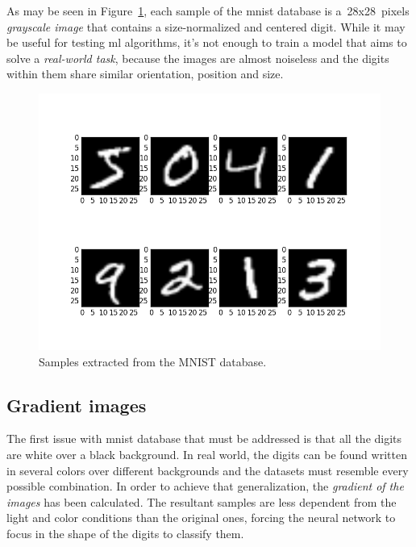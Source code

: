 As may be seen in Figure~\ref{fig:mnist}, each sample of the \gls{mnist} database is a~28x28~pixels \emph{grayscale image} that contains a size-normalized and centered digit. While it may be useful for testing \gls{ml} algorithms, it's not enough to train a model that aims to solve a \emph{real-world task}, because the images are almost noiseless and the digits within them share similar orientation, position and size.
\begin{figure}
	\centering
	\includegraphics[width=12cm, keepaspectratio]{figures/mnist.png}
	\caption{Samples extracted from the MNIST database.}
	\label{fig:mnist}
\end{figure}

\subsection{Gradient images}\label{subsec:edge}
The first issue with \gls{mnist} database that must be addressed is that all the digits are white over a black background. In real world, the digits can be found written in several colors over different backgrounds and the datasets must resemble every possible combination. In order to achieve that generalization, the \emph{gradient of the images} has been calculated. The resultant samples are less dependent from the light and color conditions than the original ones, forcing the neural network to focus in the shape of the digits to classify them.

